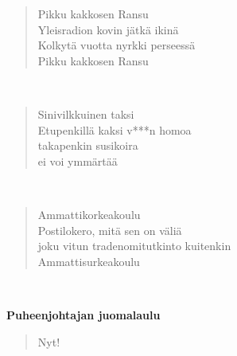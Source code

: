 \noindent\begin{minipage}{\linewidth}
\begin{verse}
	Pikku kakkosen Ransu\\
	Yleisradion kovin jätkä ikinä\\
	Kolkytä vuotta nyrkki perseessä\\
	Pikku kakkosen Ransu\\
\end{verse}
\end{minipage}\\[10pt]
\noindent\begin{minipage}{\linewidth}
\begin{verse}
	Sinivilkkuinen taksi\\
	Etupenkillä kaksi v***n homoa\\
	takapenkin susikoira\\
	ei voi ymmärtää\\
\end{verse}
\end{minipage}\\[10pt]
\noindent\begin{minipage}{\linewidth}
\begin{verse}
	Ammattikorkeakoulu\\
	Postilokero, mitä sen on väliä\\
	joku vitun tradenomitutkinto kuitenkin\\
	Ammattisurkeakoulu\\
\end{verse}
\end{minipage}\\[10pt]
%
%
\noindent\begin{minipage}{\linewidth}
\vspace{5pt}
\parbox[t]{0.85\linewidth}{\raggedright {\large\bf Puheenjohtajan juomalaulu}\\[6pt]}
\begin{verse}
	Nyt!\\
\end{verse}
\end{minipage}\\[10pt]
%
%
